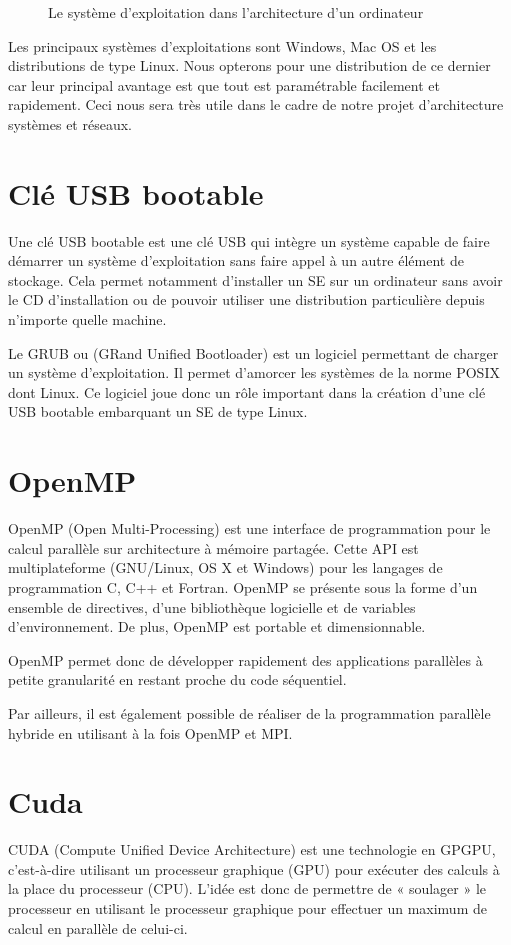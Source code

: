 \documentclass[final]{polytech/polytech}
\begin{document}
\begin{figure}
	\caption{Le système d'exploitation dans l'architecture d'un ordinateur}
	\label{fig:se_architecture}
\end{figure}

Les principaux systèmes d'exploitations sont Windows, Mac OS et les distributions de type Linux. Nous opterons pour une distribution de ce dernier car leur principal avantage est que tout est paramétrable facilement et rapidement. Ceci nous sera très utile dans le cadre de notre projet d'architecture systèmes et réseaux.

\section{Clé USB bootable}
Une clé USB bootable est une clé USB qui intègre un système capable de faire démarrer un système d'exploitation sans faire appel à un autre élément de stockage. Cela permet notamment d'installer un SE sur un ordinateur sans avoir le CD d'installation ou de pouvoir utiliser une distribution particulière depuis n'importe quelle machine.

Le GRUB ou (GRand Unified Bootloader) est un logiciel permettant de charger un système d'exploitation. Il permet d'amorcer les systèmes de la norme POSIX dont Linux. Ce logiciel joue donc un rôle important dans la création d'une clé USB bootable embarquant un SE de type Linux.

\section{OpenMP}
OpenMP (Open Multi-Processing) est une interface de programmation pour le calcul parallèle sur architecture à mémoire partagée. Cette API est multiplateforme (GNU/Linux, OS X et Windows) pour les langages de programmation C, C++ et Fortran. OpenMP se présente sous la forme d’un ensemble de directives, d’une bibliothèque logicielle et de variables d’environnement. De plus, OpenMP est portable et dimensionnable.

OpenMP permet donc de développer rapidement des applications parallèles à petite granularité en restant proche du code séquentiel.


Par ailleurs, il est également possible de réaliser de la programmation parallèle hybride en utilisant à la fois OpenMP et MPI.


\section{Cuda}
CUDA (Compute Unified Device Architecture) est une technologie en GPGPU, c’est-à-dire utilisant un processeur graphique (GPU) pour exécuter des calculs à la place du processeur (CPU). L’idée est donc de permettre de « soulager » le processeur en utilisant le processeur graphique pour effectuer un maximum de calcul en parallèle de celui-ci.
\end{document}
